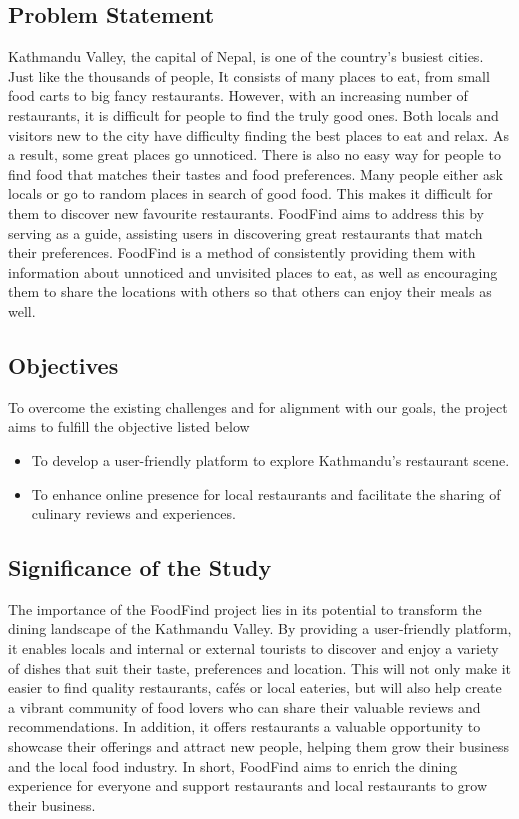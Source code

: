 \documentclass[12pt, a4paper, oneside]{article}
\begin{document}
\subsection{Problem Statement}
Kathmandu Valley, the capital of Nepal, is one of the country's busiest cities. Just like the thousands of people, It consists of many places to eat, from small food carts to big fancy restaurants. However, with an increasing number of restaurants, it is difficult for people to find the truly good ones. Both locals and visitors new to the city have difficulty finding the best places to eat and relax. As a result, some great places go unnoticed. There is also no easy way for people to find food that matches their tastes and food preferences.  Many people either ask locals or go to random places in search of good food. This makes it difficult for them to discover new favourite restaurants. FoodFind aims to address this by serving as a guide, assisting users in discovering great restaurants that match their preferences. FoodFind is a method of consistently providing them with information about unnoticed and unvisited places to eat, as well as encouraging them to share the locations with others so that others can enjoy their meals as well.

\subsection{Objectives}
To overcome the existing challenges and for alignment with our goals, the project aims to fulfill the objective listed below
\begin{itemize}
	\item  To develop a user-friendly platform to explore Kathmandu’s restaurant scene.
    \item To enhance online presence for local restaurants and facilitate the sharing of culinary reviews and experiences.
\end{itemize}

\subsection{Significance of the Study}
The importance of the FoodFind project lies in its potential to transform the dining landscape of the Kathmandu Valley. By providing a user-friendly platform, it enables locals and internal or external tourists to discover and enjoy a variety of dishes that suit their taste, preferences and location. This will not only make it easier to find quality restaurants, cafés or local eateries, but will also help create a vibrant community of food lovers who can share their valuable reviews and recommendations. In addition, it offers restaurants a valuable opportunity to showcase their offerings and attract new people, helping them grow their business and the local food industry. In short, FoodFind aims to enrich the dining experience for everyone and support restaurants and local restaurants to grow their business.
\end{document}

